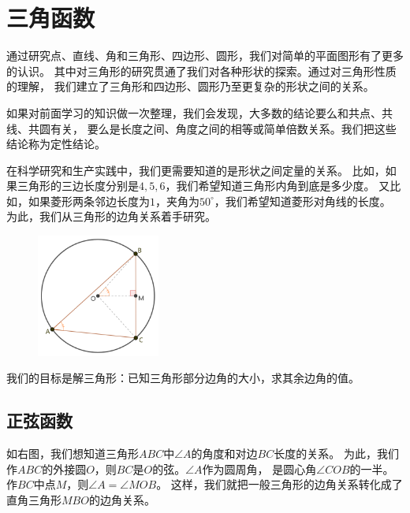 \documentclass[12pt,UTF8]{ctexbook}
\begin{document}



\chapter{三角函数}
通过研究点、直线、角和三角形、四边形、圆形，我们对简单的平面图形有了更多的认识。
其中对三角形的研究贯通了我们对各种形状的探索。通过对三角形性质的理解，
我们建立了三角形和四边形、圆形乃至更复杂的形状之间的关系。

如果对前面学习的知识做一次整理，我们会发现，大多数的结论要么和共点、共线、共圆有关，
要么是长度之间、角度之间的相等或简单倍数关系。我们把这些结论称为定性结论。

在科学研究和生产实践中，我们更需要知道的是形状之间定量的关系。
比如，如果三角形的三边长度分别是$4,5,6$，我们希望知道三角形内角到底是多少度。
又比如，如果菱形两条邻边长度为$1$，夹角为$50^\circ$，我们希望知道菱形对角线的长度。
为此，我们从三角形的边角关系着手研究。

\begin{figure} %
    \vspace{-0pt}
    \flushright
    \includegraphics[width=0.36\textwidth]{三角函数1.png}
\end{figure}
我们的目标是解三角形：已知三角形部分边角的大小，求其余边角的值。

\section{正弦函数}
如右图，我们想知道三角形$ABC$中$\angle A$的角度和对边$BC$长度的关系。
为此，我们作$ABC$的外接圆$O$，则$BC$是$O$的弦。$\angle A$作为圆周角，
是圆心角$\angle COB$的一半。作$BC$中点$M$，则$\angle A = \angle MOB$。
这样，我们就把一般三角形的边角关系转化成了直角三角形$MBO$的边角关系。
\end{document}
